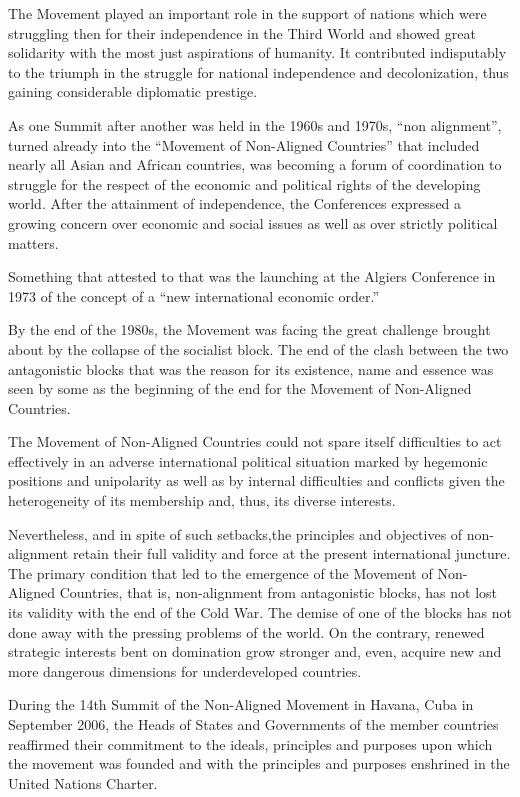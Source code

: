 \documentclass[
  openany]{book}
\begin{document}
The Movement played an important role in the support of nations which were struggling then for their independence in the Third World and showed great solidarity with the most just aspirations of humanity. It contributed indisputably to the triumph in the struggle for national independence and decolonization, thus gaining considerable diplomatic prestige.

As one Summit after another was held in the 1960s and 1970s, ``non alignment'', turned already into the ``Movement of Non-Aligned Countries'' that included nearly all Asian and African countries, was becoming a forum of coordination to struggle for the respect of the economic and political rights of the developing world. After the attainment of independence, the Conferences expressed a growing concern over economic and social issues as well as over strictly political matters.

Something that attested to that was the launching at the Algiers Conference in 1973 of the concept of a ``new international economic order.''

By the end of the 1980s, the Movement was facing the great challenge brought about by the collapse of the socialist block. The end of the clash between the two antagonistic blocks that was the reason for its existence, name and essence was seen by some as the beginning of the end for the Movement of Non-Aligned Countries.

The Movement of Non-Aligned Countries could not spare itself difficulties to act effectively in an adverse international political situation marked by hegemonic positions and unipolarity as well as by internal difficulties and conflicts given the heterogeneity of its membership and, thus, its diverse interests.

Nevertheless, and in spite of such setbacks,the principles and objectives of non-alignment retain their full validity and force at the present international juncture. The primary condition that led to the emergence of the Movement of Non-Aligned Countries, that is, non-alignment from antagonistic blocks, has not lost its validity with the end of the Cold War. The demise of one of the blocks has not done away with the pressing problems of the world. On the contrary, renewed strategic interests bent on domination grow stronger and, even, acquire new and more dangerous dimensions for underdeveloped countries.

During the 14th Summit of the Non-Aligned Movement in Havana, Cuba in September 2006, the Heads of States and Governments of the member countries reaffirmed their commitment to the ideals, principles and purposes upon which the movement was founded and with the principles and purposes enshrined in the United Nations Charter.
\end{document}
